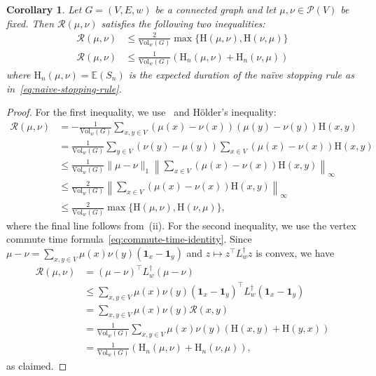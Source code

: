 \documentclass[11pt,a4paper]{article}
\newcommand{\Resis}{\mathcal{R}}
\newcommand{\Prob}{\mathscr{P}}
\newcommand{\Hitting}{\mathrm{H}}
\newcommand{\Vol}{\mathrm{Vol}}
\newcommand{\ep}[1]{\mathbb{E}\left({#1}\right)}
\newtheorem{corollary}[theorem]{Corollary}
\begin{document}
\begin{corollary}\label{cor:measure-commute-time-inequalities}
    Let $G=(V,E,w)$ be a connected graph and let $\mu,\nu\in\Prob(V)$ be fixed. Then $\Resis(\mu,\nu)$ satisfies the following two inequalities:
        \begin{align}
            \Resis(\mu,\nu) &\leq \frac{2}{\Vol_w(G)} \max\{\Hitting(\mu,\nu), \Hitting(\nu,\mu)\}\\
            \Resis(\mu,\nu) &\leq \frac{1}{\Vol_w(G)} (\Hitting_n(\mu,\nu) + \Hitting_n(\nu, \mu))
        \end{align}
    where $\Hitting_n(\mu,\nu) = \ep{S_n}$ is the expected duration of the na\"{i}ve stopping rule as in~\cref{eq:naive-stopping-rule}.
\end{corollary}

\begin{proof}
    For the first inequality, we use~ and H\"older's inequality:
        \begin{align*}
            \Resis(\mu,\nu) &= -\frac{1}{\Vol_w(G)} \sum_{x, y\in V}(\mu(x) - \nu(x)) (\mu(y) - \nu(y)) \Hitting(x, y)\\
            &= \frac{1}{\Vol_w(G)} \sum_{y\in V} (\nu(y) - \mu(y)) \sum_{x\in V} (\mu(x) - \nu(x)) \Hitting(x, y)\\
            &\leq \frac{1}{\Vol_w(G)} \|\mu-\nu\|_1 \left\| \sum_{x\in V} (\mu(x) - \nu(x)) \Hitting(x, y)\right\|_\infty\\
            &\leq \frac{2}{\Vol_w(G)} \left\| \sum_{x\in V} (\mu(x) - \nu(x)) \Hitting(x, y)\right\|_\infty\\
            &\leq \frac{2}{\Vol_w(G)} \max\{\Hitting(\mu,\nu), \Hitting(\nu,\mu)\},
        \end{align*}
    where the final line follows from~(ii). For the second inequality, we use the vertex commute time formula~\cref{eq:commute-time-identity}. Since $\mu-\nu = \sum_{x,y\in V} \mu(x)\nu(y)(\mathbf{1}_x - \mathbf{1}_y)$ and $z\mapsto z^\top L_w^\dagger z$ is convex, we have
        \begin{align*}
            \Resis(\mu,\nu) &= (\mu-\nu)^\top L_w^\dagger (\mu-\nu)\\
            &\leq \sum_{x,y\in V} \mu(x)\nu(y) (\mathbf{1}_x - \mathbf{1}_y)^\top L_w^\dagger (\mathbf{1}_x - \mathbf{1}_y)\\
            &= \sum_{x,y\in V} \mu(x)\nu(y) \Resis(x, y)\\
            &= \frac{1}{\Vol_w(G)} \sum_{x,y\in V} \mu(x)\nu(y) (\Hitting(x,y) + \Hitting(y,x))\\
            &= \frac{1}{\Vol_w(G)} (\Hitting_n(\mu,\nu) + \Hitting_n(\nu,\mu)),
        \end{align*}
    as claimed.
\end{proof}
\end{document}

